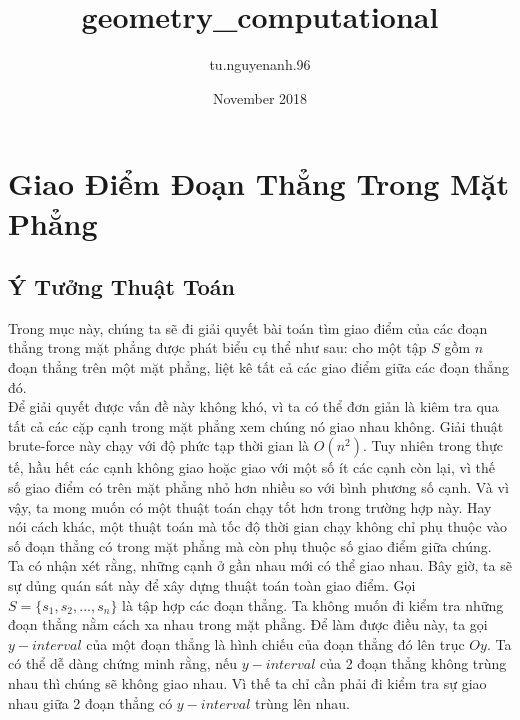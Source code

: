 \documentclass[15pt]{article}
\title{geometry_computational}
\author{tu.nguyenanh.96 }
\date{November 2018}
\begin{document}
\section{Giao Điểm Đoạn Thẳng Trong Mặt Phẳng}
\subsection{Ý Tưởng Thuật Toán}
Trong mục này, chúng ta sẽ đi giải quyết bài toán tìm giao điểm của các đoạn thẳng trong mặt phẳng được phát biểu cụ thể như sau: cho một tập $S$ gồm $n$ đoạn thẳng trên một mặt phẳng, liệt kê tất cả các giao điểm giữa các đoạn thẳng đó. \\

Để giải quyết được vấn đề này không khó, vì ta có thể đơn giản là kiêm tra qua tất cả các cặp cạnh trong mặt phẳng xem chúng nó giao nhau không. Giải thuật brute-force này chạy với độ phức tạp thời gian là $O(n^2)$. Tuy nhiên trong thực tế, hầu hết các cạnh không giao hoặc giao với một số ít các cạnh còn lại, vì thế số giao điểm có trên mặt phẳng nhỏ hơn nhiều so với bình phương số cạnh. Và vì vậy, ta mong muốn có một thuật toán chạy tốt hơn trong trường hợp này. Hay nói cách khác, một thuật toán mà tốc độ thời gian chạy không chỉ phụ thuộc vào số đoạn thẳng có trong mặt phẳng mà còn phụ thuộc số giao điểm giữa chúng. \\

Ta có nhận xét rằng, những cạnh ở gần nhau mới có thể giao nhau. Bây giờ, ta sẽ sự dủng quán sát này để xây dựng thuật toán toàn giao điểm. Gọi $S = \{s_1, s_2, ..., s_n \}$ là tập hợp các đoạn thẳng. Ta không muốn đi kiểm tra những đoạn thẳng nằm cách xa nhau trong mặt phẳng. Để làm được điều này, ta gọi $y-interval$ của một đoạn thẳng là hình chiếu của đoạn thẳng đó lên trục $Oy$. Ta có thể dễ dàng chứng minh rằng, nếu $y-interval$ của 2 đoạn thẳng không trùng nhau thì chúng sẽ không giao nhau. Vì thế ta chỉ cần phải đi kiểm tra sự giao nhau giữa 2 đoạn thẳng có $y-interval$ trùng lên nhau. \\
\end{document}
